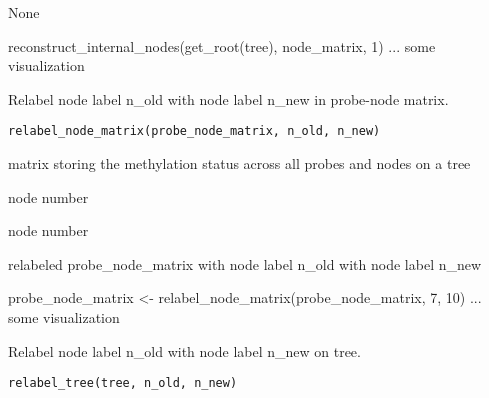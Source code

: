 \documentclass[a4paper]{book}
\begin{document}
%
\begin{Value}
None
\end{Value}
%
\begin{Examples}
\begin{ExampleCode}
reconstruct_internal_nodes(get_root(tree), node_matrix, 1)
... some visualization 
\end{ExampleCode}
\end{Examples}
%
\begin{Description}\relax
Relabel node label n\_old with node label n\_new in probe-node matrix.
\end{Description}
%
\begin{Usage}
\begin{verbatim}
relabel_node_matrix(probe_node_matrix, n_old, n_new)
\end{verbatim}
\end{Usage}
%
\begin{Arguments}
\begin{ldescription}
\item[\code{probe\_node\_matrix}] matrix storing the methylation status across all
probes and nodes on a tree

\item[\code{n\_old}] node number

\item[\code{n\_new}] node number
\end{ldescription}
\end{Arguments}
%
\begin{Value}
relabeled probe\_node\_matrix with node label n\_old with node label
n\_new
\end{Value}
%
\begin{Examples}
\begin{ExampleCode}
probe_node_matrix <- relabel_node_matrix(probe_node_matrix, 7, 10)
... some visualization 
\end{ExampleCode}
\end{Examples}
%
\begin{Description}\relax
Relabel node label n\_old with node label n\_new on tree.
\end{Description}
%
\begin{Usage}
\begin{verbatim}
relabel_tree(tree, n_old, n_new)
\end{verbatim}
\end{Usage}
\end{document}
